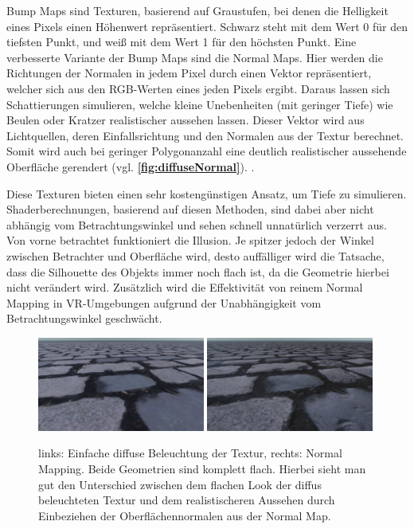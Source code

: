 Bump Maps sind Texturen, basierend auf Graustufen, bei denen die Helligkeit eines Pixels
einen Höhenwert repräsentiert. Schwarz steht mit dem Wert 0 für den tiefsten Punkt, und weiß mit dem Wert 1 für den höchsten Punkt.
Eine verbesserte Variante der Bump Maps sind die Normal Maps.
Hier werden die Richtungen der Normalen in jedem Pixel durch einen Vektor repräsentiert,
welcher sich aus den RGB-Werten eines jeden Pixels ergibt. Daraus lassen sich Schattierungen simulieren,
welche kleine Unebenheiten (mit geringer Tiefe) wie Beulen oder Kratzer realistischer aussehen lassen.
Dieser Vektor wird aus Lichtquellen, deren Einfallsrichtung und den Normalen aus der Textur berechnet.
Somit wird auch bei geringer Polygonanzahl eine deutlich realistischer aussehende Oberfläche gerendert (vgl. \textbf{\autoref{fig:diffuseNormal}}).
\parencite{Cohen1998}.

Diese Texturen bieten einen sehr kostengünstigen
Ansatz, um Tiefe zu simulieren. Shaderberechnungen, basierend auf diesen Methoden, sind dabei aber nicht abhängig
vom Betrachtungswinkel und sehen schnell unnatürlich verzerrt aus.
Von vorne betrachtet funktioniert die Illusion. Je spitzer jedoch der Winkel zwischen Betrachter und
Oberfläche wird, desto auffälliger wird die Tatsache, dass die Silhouette des Objekts immer
noch flach ist, da die Geometrie hierbei nicht verändert wird.
Zusätzlich wird die Effektivität von reinem Normal Mapping in VR-Umgebungen aufgrund der Unabhängigkeit vom Betrachtungswinkel
geschwächt. 

\begin{figure}[h!t]
	\centering
	\includegraphics[width=0.49\textwidth]{Grafiken/Basics/Mapping/Vergleich_Diffuse.png}
	\includegraphics[width=0.49\textwidth]{Grafiken/Basics/Mapping/Vergleich_Normal.png}
	\begin{footnotesize}
		\caption{links: Einfache diffuse Beleuchtung der Textur, rechts: Normal Mapping. Beide Geometrien sind komplett flach. 
		Hierbei sieht man gut den Unterschied zwischen dem flachen Look
		der diffus beleuchteten Textur und dem realistischeren Aussehen durch Einbeziehen der Oberflächennormalen aus der Normal Map.}
		\label{fig:diffuseNormal}
	\end{footnotesize}
\end{figure}

